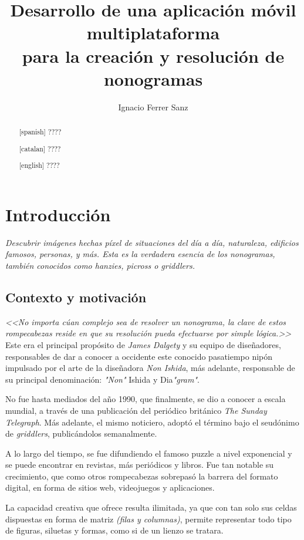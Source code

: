 \documentclass[11pt,spanish,listoffigures,listoftables]{tfgetsinf}
\title{Desarrollo de una aplicación móvil multiplataforma \\
para la creación y resolución de nonogramas}
\author{Ignacio Ferrer Sanz}
\begin{document}

\begin{abstract}[spanish]
????
\end{abstract}
\begin{abstract}[catalan]
   ????
\end{abstract}
\begin{abstract}[english]
????
\end{abstract}

\mainmatter

\chapter{Introducción}

\textit{Descubrir imágenes hechas píxel de situaciones del día a día, naturaleza, edificios famosos, personas, y más. Esta es la verdadera 
esencia de los nonogramas, también conocidos como hanzies, picross o griddlers.}

\section{Contexto y motivación}

\textit{<<No importa cúan complejo sea de resolver un nonograma, la clave de estos rompecabezas reside en que su resolución pueda efectuarse
por simple lógica.>>} Este era el principal propósito de \textit{James Dalgety} y su equipo de diseñadores, 
responsables de dar a conocer a occidente este conocido pasatiempo nipón impulsado por el arte de la diseñadora \textit{Non Ishida}, más adelante,
responsable de su principal denominación: \textit{"Non"} Ishida y Dia\textit{"gram"}.

No fue hasta mediados del año 1990, que finalmente, se dio a conocer a escala mundial, a través de una publicación del 
periódico británico \textit{The Sunday Telegraph}. Más adelante, el mismo noticiero, adoptó el término bajo el seudónimo de \textit{griddlers},
publicándolos semanalmente.

A lo largo del tiempo, se fue difundiendo el famoso puzzle a nivel exponencial y se puede encontrar en revistas, más periódicos y libros. 
Fue tan notable su crecimiento, que como otros rompecabezas sobrepasó la barrera del formato digital, en forma de sitios web, videojuegos y aplicaciones.

La capacidad creativa que ofrece resulta ilimitada, ya que con tan solo sus celdas dispuestas en forma de matriz \textit{(filas y columnas)},
permite representar todo tipo de figuras, siluetas y formas, como si de un lienzo se tratara. 
\end{document}
